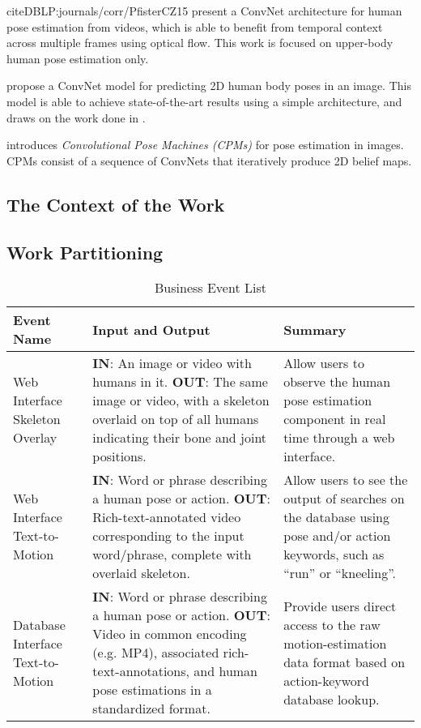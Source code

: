 \documentclass{scrreprt}
\begin{document}
cite{DBLP:journals/corr/PfisterCZ15} present a ConvNet architecture for human
pose estimation from videos, which is able to benefit from temporal context
across multiple frames using optical flow. This work is focused on upper-body
human pose estimation only.

\cite{DBLP:journals/corr/BelagiannisZ16} propose a ConvNet model for predicting
2D human body poses in an image. This model is able to achieve state-of-the-art
results using a simple architecture, and draws on the work done in
\cite{DBLP:journals/corr/PfisterCZ15}.

\cite{DBLP:journals/corr/WeiRKS16} introduces \textit{Convolutional Pose
Machines (CPMs)} for pose estimation in images. CPMs consist of a sequence of
ConvNets that iteratively produce 2D belief maps.

\subsection{The Context of the Work}

\subsection{Work Partitioning}

\begin{table}
\caption{Business Event List}
\begin{center}
    \begin{tabular}{ | p{5cm} | p{5cm} | p{5cm} |}
    \hline
    Event Name & Input and Output & Summary \\
    \hline
    Web Interface Skeleton Overlay
            & \textbf{IN}: An image or video with humans in it.\newline
            \textbf{OUT}: The same image or video, with a skeleton overlaid on
            top of all humans indicating their bone and joint positions.
            & Allow users to observe the human pose estimation component in
            real time through a web interface.\\
    Web Interface Text-to-Motion
            & \textbf{IN}: Word or phrase describing a human pose or action.\newline
            \textbf{OUT}: Rich-text-annotated video corresponding to the input
            word/phrase, complete with overlaid skeleton.
            & Allow users to see the output of searches on the database using
            pose and/or action keywords, such as ``run'' or ``kneeling''.\\
    Database Interface Text-to-Motion
            & \textbf{IN}: Word or phrase describing a human pose or action.\newline
            \textbf{OUT}: Video in common encoding (e.g. MP4), associated
            rich-text-annotations, and human pose estimations in a standardized
            format.
            & Provide users direct access to the raw motion-estimation data
            format based on action-keyword database lookup.\\
    \hline
    \end{tabular}
\end{center}
\end{table}
\end{document}
